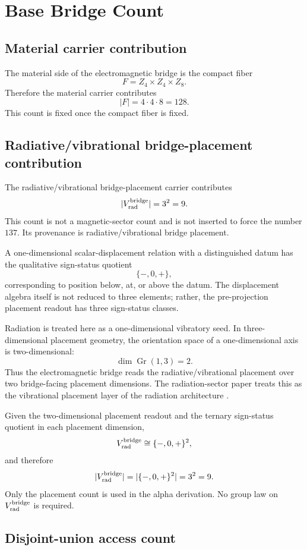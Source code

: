 \section{Base Bridge Count}

\subsection{Material carrier contribution}

The material side of the electromagnetic bridge is the compact fiber
\[
F=Z_4\times Z_4\times Z_8.
\]
Therefore the material carrier contributes
\[
|F|=4\cdot4\cdot8=128.
\]
This count is fixed once the compact fiber is fixed.

\subsection{Radiative/vibrational bridge-placement contribution}

The radiative/vibrational bridge-placement carrier contributes
\[
|V_{\rm rad}^{\rm bridge}|=3^2=9.
\]
This count is not a magnetic-sector count and is not inserted to force
the number \(137\). Its provenance is radiative/vibrational bridge
placement.

A one-dimensional scalar-displacement relation with a distinguished datum
has the qualitative sign-status quotient
\[
\{-,0,+\},
\]
corresponding to position below, at, or above the datum. The displacement
algebra itself is not reduced to three elements; rather, the
pre-projection placement readout has three sign-status classes.

Radiation is treated here as a one-dimensional vibratory seed. In
three-dimensional placement geometry, the orientation space of a
one-dimensional axis is two-dimensional:
\[
\dim \operatorname{Gr}(1,3)=2.
\]
Thus the electromagnetic bridge reads the radiative/vibrational placement
over two bridge-facing placement dimensions. The radiation-sector paper
treats this as the vibrational placement layer of the radiation
architecture \cite{Wells2026Radiation}.

Given the two-dimensional placement readout and the ternary sign-status
quotient in each placement dimension,
\[
V_{\rm rad}^{\rm bridge}
\cong
\{-,0,+\}^2,
\]
and therefore
\[
|V_{\rm rad}^{\rm bridge}|
=
|\{-,0,+\}^2|
=
3^2
=
9.
\]
Only the placement count is used in the alpha derivation. No group law on
\(V_{\rm rad}^{\rm bridge}\) is required.

\subsection{Disjoint-union access count}

